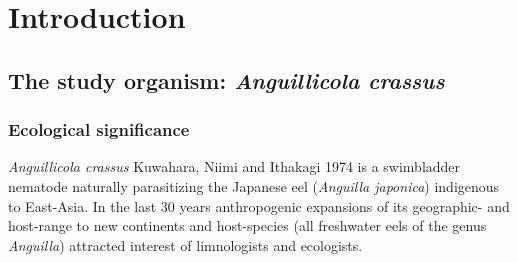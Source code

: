 

\chapter{Introduction}

\ifpdf
    \graphicspath{{1_introduction/figures/PNG/}{1_introduction/figures/PDF/}{1_introduction/figures/}}
\else
    \graphicspath{{1_introduction/figures/EPS/}{1_introduction/figures/}}
\fi







\section{The study organism: \textit{Anguillicola crassus}} 

\subsection{Ecological significance} 

\textit{Anguillicola crassus} Kuwahara, Niimi and Ithakagi 1974
\cite{kuwahara_Niimi_Itagaki_1974, moravec_anguillicoloides} is a
swimbladder nematode naturally parasitizing the Japanese eel
(\textit{Anguilla japonica}) indigenous to East-Asia. In the last 30
years anthropogenic expansions of its geographic- and host-range to
new continents and host-species (all freshwater eels of the genus
\textit{Anguilla}) attracted interest of limnologists and ecologists.

